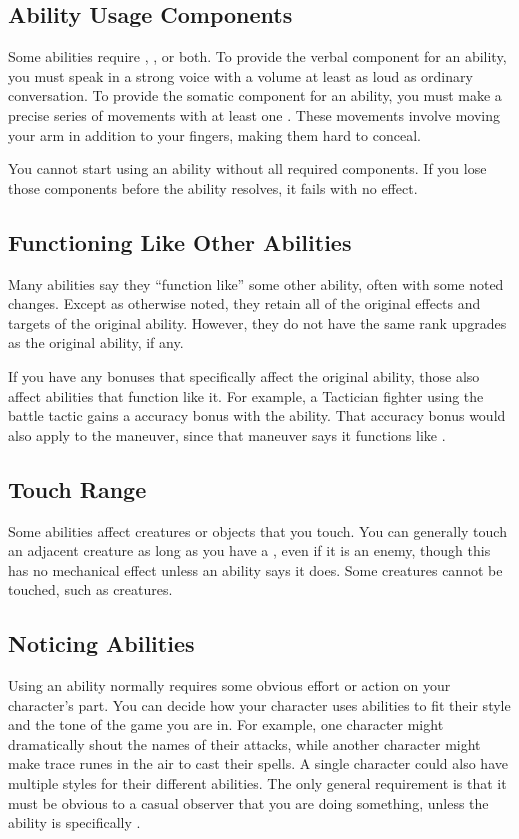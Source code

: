   \subsection{Ability Usage Components}\label{Ability Usage Components}
    Some abilities require , , or both.
    To provide the verbal component for an ability, you must speak in a strong voice with a volume at least as loud as ordinary conversation.
    To provide the somatic component for an ability, you must make a precise series of movements with at least one .
    These movements involve moving your arm in addition to your fingers, making them hard to conceal.

    You cannot start using an ability without all required components.
    If you lose those components before the ability resolves, it fails with no effect.

  \subsection{Functioning Like Other Abilities}\label{Functioning Like Other Abilities}
    Many abilities say they ``function like'' some other ability, often with some noted changes.
    Except as otherwise noted, they retain all of the original effects and targets of the original ability.
    However, they do not have the same rank upgrades as the original ability, if any.

    If you have any bonuses that specifically affect the original ability, those also affect abilities that function like it.
    For example, a Tactician fighter using the  battle tactic gains a  accuracy bonus with the  ability.
    That accuracy bonus would also apply to the  maneuver, since that maneuver says it functions like .

  \subsection{Touch Range}
    Some abilities affect creatures or objects that you touch.
    You can generally touch an adjacent creature as long as you have a , even if it is an enemy, though this has no mechanical effect unless an ability says it does.
    Some creatures cannot be touched, such as  creatures.

  \subsection{Noticing Abilities}
    Using an ability normally requires some obvious effort or action on your character's part.
    You can decide how your character uses abilities to fit their style and the tone of the game you are in.
    For example, one character might dramatically shout the names of their attacks, while another character might make trace runes in the air to cast their spells.
    A single character could also have multiple styles for their different abilities.
    The only general requirement is that it must be obvious to a casual observer that you are doing something, unless the ability is specifically .

